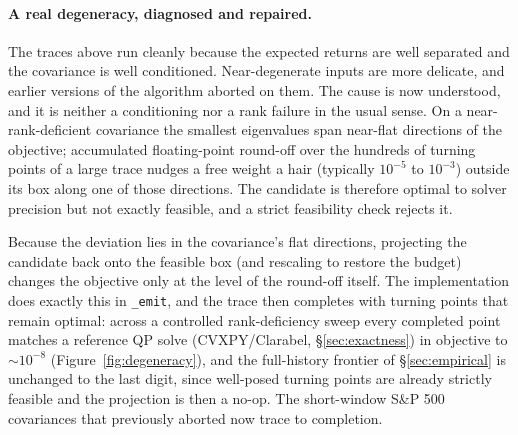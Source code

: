 \documentclass[11pt]{article}
\begin{document}
\paragraph{A real degeneracy, diagnosed and repaired.}
The traces above run cleanly because the expected returns are well separated and
the covariance is well conditioned. Near-degenerate inputs are more delicate, and
earlier versions of the algorithm aborted on them. The cause is now understood,
and it is neither a conditioning nor a rank failure in the usual sense. On a
near-rank-deficient covariance the smallest eigenvalues span near-flat directions
of the objective; accumulated floating-point round-off over the hundreds of
turning points of a large trace nudges a free weight a hair (typically $10^{-5}$
to $10^{-3}$) outside its box along one of those directions. The candidate is
therefore optimal to solver precision but not exactly feasible, and a strict
feasibility check rejects it.

Because the deviation lies in the covariance's flat directions, projecting the
candidate back onto the feasible box (and rescaling to restore the budget)
changes the objective only at the level of the round-off itself. The
implementation does exactly this in \texttt{\_emit}, and the trace then completes
with turning points that remain optimal: across a controlled rank-deficiency
sweep every completed point matches a reference QP solve (CVXPY/Clarabel,
\S\ref{sec:exactness}) in objective to $\sim\!10^{-8}$
(Figure~\ref{fig:degeneracy}), and the full-history frontier of
\S\ref{sec:empirical} is unchanged to the last digit, since well-posed turning
points are already strictly feasible and the projection is then a no-op. The
short-window S\&P 500 covariances that previously aborted now trace to
completion.
\end{document}
